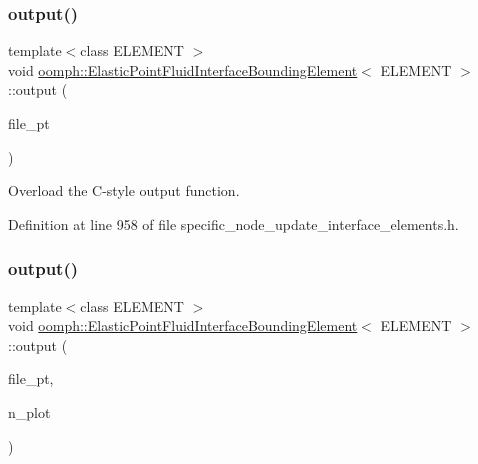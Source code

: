 \subsubsection{\texorpdfstring{output()}{output()}\hspace{0.1cm}{\footnotesize\ttfamily [3/4]}}
{\footnotesize\ttfamily template$<$class E\+L\+E\+M\+E\+NT $>$ \\
void \hyperlink{classoomph_1_1ElasticPointFluidInterfaceBoundingElement}{oomph\+::\+Elastic\+Point\+Fluid\+Interface\+Bounding\+Element}$<$ E\+L\+E\+M\+E\+NT $>$\+::output (\begin{DoxyParamCaption}\item[{F\+I\+LE $\ast$}]{file\+\_\+pt }\end{DoxyParamCaption})\hspace{0.3cm}{\ttfamily [inline]}}



Overload the C-\/style output function. 



Definition at line 958 of file specific\+\_\+node\+\_\+update\+\_\+interface\+\_\+elements.\+h.

\mbox{\label{classoomph_1_1ElasticPointFluidInterfaceBoundingElement_a4b30d56cc1869b5c9c4819843fb65ecc}} 
\subsubsection{\texorpdfstring{output()}{output()}\hspace{0.1cm}{\footnotesize\ttfamily [4/4]}}
{\footnotesize\ttfamily template$<$class E\+L\+E\+M\+E\+NT $>$ \\
void \hyperlink{classoomph_1_1ElasticPointFluidInterfaceBoundingElement}{oomph\+::\+Elastic\+Point\+Fluid\+Interface\+Bounding\+Element}$<$ E\+L\+E\+M\+E\+NT $>$\+::output (\begin{DoxyParamCaption}\item[{F\+I\+LE $\ast$}]{file\+\_\+pt,  }\item[{const unsigned \&}]{n\+\_\+plot }\end{DoxyParamCaption})\hspace{0.3cm}{\ttfamily [inline]}}



